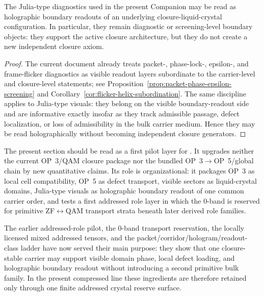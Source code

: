 \begin{proposition}
\label{prop:holographic-julia-boundary-principle}
The Julia-type diagnostics used in the present Companion may be read as holographic boundary readouts of an underlying closure-liquid-crystal configuration. In particular, they remain diagnostic or screening-level boundary objects: they support the active closure architecture, but they do not create a new independent closure axiom.
\end{proposition}

\begin{proof}
The current document already treats packet-, phase-lock-, epsilon-, and frame-flicker diagnostics as visible readout layers subordinate to the carrier-level and closure-level statements; see Proposition~\ref{prop:packet-phase-epsilon-screening} and Corollary~\ref{cor:flicker-helix-subordination}. The same discipline applies to Julia-type visuals: they belong on the visible boundary-readout side and are informative exactly insofar as they track admissible passage, defect localization, or loss of admissibility in the bulk carrier medium. Hence they may be read holographically without becoming independent closure generators.
\end{proof}

\begin{remark}
\label{rem:v320-pilot-status}
The present section should be read as a first pilot layer for . It upgrades neither the current OP~3/QAM closure package nor the bundled OP~3$\to$OP~5/global chain by new quantitative claims. Its role is organizational: it packages OP~3 as local cell compatibility, OP~5 as defect transport, visible sectors as liquid-crystal domains, Julia-type visuals as holographic boundary readout of one common carrier order, and tests a first addressed role layer in which the 0-band is reserved for primitive ZF$\leftrightarrow$QAM transport strata beneath later derived role families.
\end{remark}


\begin{remark}
\label{rem:status-of-the-compressed-addressed-crystal-reserve-surface}
The earlier addressed-role pilot, the 0-band transport reservation, the locally licensed mixed addressed tensors, and the packet/corridor/hologram/readout-class ladder have now served their main purpose: they show that one closure-stable carrier may support visible domain phase, local defect loading, and holographic boundary readout without introducing a second primitive bulk family. In the present compressed line these ingredients are therefore retained only through one finite addressed crystal reserve surface.
\end{remark}

